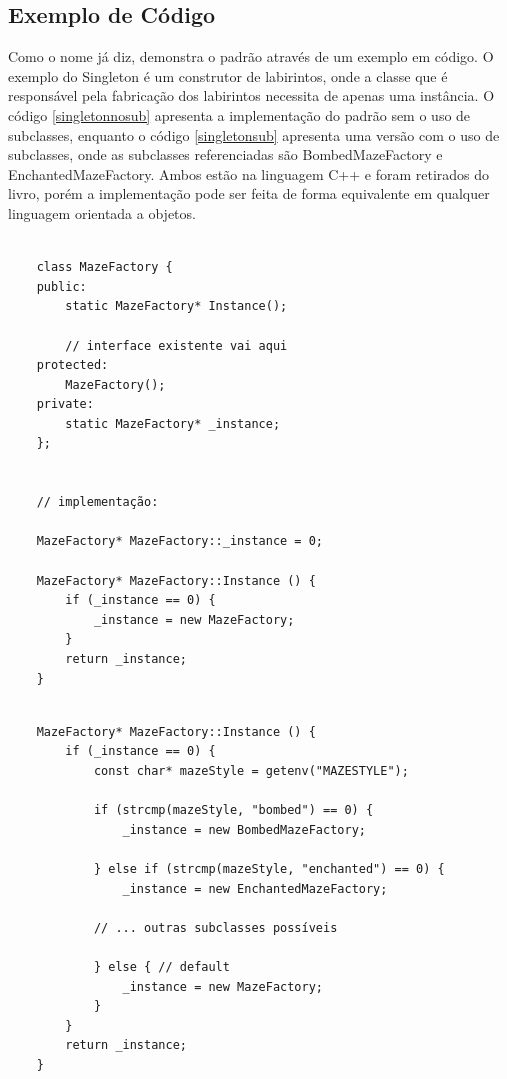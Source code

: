 \subsection*{Exemplo de Código}

Como o nome já diz, demonstra o padrão através de 
um exemplo em código. O exemplo do Singleton é um 
construtor de labirintos, onde a classe que é 
responsável pela fabricação dos labirintos necessita 
de apenas uma instância. O código \ref{singletonnosub}
apresenta a implementação do padrão sem o uso de 
subclasses, enquanto o código \ref{singletonsub} 
apresenta uma versão com o uso de subclasses, 
onde as subclasses referenciadas são BombedMazeFactory  
e EnchantedMazeFactory. 
Ambos estão na linguagem C++ e foram retirados 
do livro, porém a implementação pode ser feita 
de forma equivalente em qualquer linguagem 
orientada a objetos.

\begin{lstlisting}[caption={Exemplo de Singleton sem subclasses}, label=singletonnosub]
    
    class MazeFactory {
    public:
        static MazeFactory* Instance();

        // interface existente vai aqui
    protected:
        MazeFactory();
    private:
        static MazeFactory* _instance;
    };


    // implementação:

    MazeFactory* MazeFactory::_instance = 0;

    MazeFactory* MazeFactory::Instance () {
        if (_instance == 0) {
            _instance = new MazeFactory;
        } 
        return _instance;
    } 

\end{lstlisting}


\begin{lstlisting}[caption={Exemplo de Singleton com subclasses},label=singletonsub]
    
    MazeFactory* MazeFactory::Instance () {
        if (_instance == 0) {
            const char* mazeStyle = getenv("MAZESTYLE");

            if (strcmp(mazeStyle, "bombed") == 0) {
                _instance = new BombedMazeFactory;

            } else if (strcmp(mazeStyle, "enchanted") == 0) {
                _instance = new EnchantedMazeFactory;

            // ... outras subclasses possíveis

            } else { // default
                _instance = new MazeFactory;
            }
        }
        return _instance;
    } 

\end{lstlisting}


